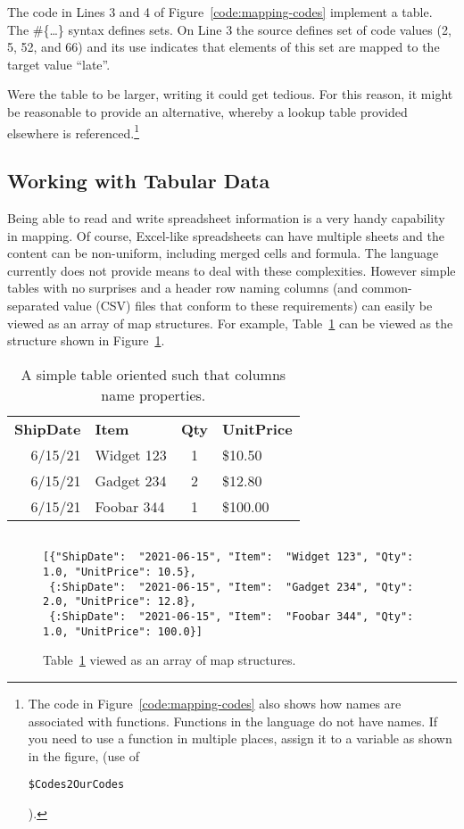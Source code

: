 \documentclass[9pt,letterpaper]{article}
\newcommand{\stt}[1]{\begin{footnotesize}\texttt{#1}\end{footnotesize}}
\begin{document}
The code in Lines 3 and 4 of Figure~\ref{code:mapping-codes} implement a table.
The \#\{\ldots\} syntax defines sets.
On Line 3 the source defines set of code values (2, 5, 52, and 66) and its use indicates that elements of this set are mapped to the target value ``late''.

Were the table to be larger, writing it could get tedious.
For this reason, it might be reasonable to provide an alternative, whereby a lookup table provided elsewhere is referenced.\footnote{The code in Figure~\ref{code:mapping-codes} also
  shows how names are associated with functions.
  Functions in the language do not have names.
  If you need to use a function in multiple places, assign it to a variable as shown in the figure, (use of \stt{\$Codes2OurCodes}).}

\subsection{Working with Tabular Data}

Being able to read  and write spreadsheet information is a very handy capability in mapping.
Of course, Excel-like spreadsheets can have multiple sheets and the content can be non-uniform, including merged cells and formula.
The language currently does not provide means to deal with these complexities.
However simple tables with no surprises and a header row naming columns (and common-separated value (CSV) files that conform to these requirements) can easily be viewed as an array of map structures.
For example, Table~\ref{table:simple} can be viewed as the structure shown in Figure~\ref{code:simple}.

\begin{table}[H]
  \caption{A simple table oriented such that columns name properties.}
\label{table:simple}
\begin{tabular}{r | l | c | l}

\textbf{ShipDate}& \textbf{Item}& \textbf{Qty}& \textbf{UnitPrice} \\ \hhline{=|=|=|=}
        6/15/21	      & Widget 123   &	1	   &  \$10.50 \\
        6/15/21	      & Gadget 234   &	2	   &  \$12.80 \\
        6/15/21	      & Foobar 344   &	1	   &  \$100.00
\end{tabular}
\end{table}

\begin{figure}[H]
    \caption{Table~\ref{table:simple} viewed as an array of map structures.}
    \label{code:simple}
\begin{lstlisting}

[{"ShipDate":  "2021-06-15", "Item":  "Widget 123", "Qty": 1.0, "UnitPrice": 10.5},
 {:ShipDate":  "2021-06-15", "Item":  "Gadget 234", "Qty": 2.0, "UnitPrice": 12.8},
 {:ShipDate":  "2021-06-15", "Item":  "Foobar 344", "Qty": 1.0, "UnitPrice": 100.0}]
\end{lstlisting}
\end{figure}
\end{document}
